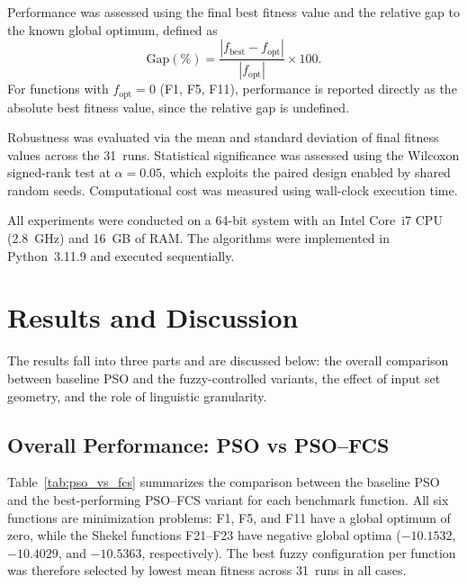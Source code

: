 \documentclass[conference]{IEEEtran}
\begin{document}
Performance was assessed using the final best fitness value and the relative gap to the known global optimum, defined as
\begin{equation}
    \text{Gap}(\%) =
    \frac{\left| f_{\text{best}} - f_{\text{opt}} \right|}
    {\left| f_{\text{opt}} \right|} \times 100.
    \label{eq:gap_metric}
\end{equation}
For functions with $f_{\text{opt}} = 0$ (F1, F5, F11), performance is reported directly as the absolute best fitness value, since the relative gap is undefined.

Robustness was evaluated via the mean and standard deviation of final fitness values across the 31~runs. Statistical significance was assessed using the Wilcoxon signed-rank test at $\alpha = 0.05$, which exploits the paired design enabled by shared random seeds. Computational cost was measured using wall-clock execution time.

All experiments were conducted on a 64-bit system with an Intel Core~i7 CPU (2.8~GHz) and 16~GB of RAM. The algorithms were implemented in Python~3.11.9 and executed sequentially.




\section{Results and Discussion}
\label{sec:results}

The results fall into three parts and are discussed below: the overall comparison between baseline PSO and the fuzzy-controlled variants, the effect of input set geometry, and the role of linguistic granularity.

\subsection{Overall Performance: PSO vs PSO--FCS}
\label{subsec:overall_results}

Table~\ref{tab:pso_vs_fcs} summarizes the comparison between the baseline PSO and the best-performing PSO--FCS variant for each benchmark function. All six functions are minimization problems: F1, F5, and F11 have a global optimum of zero, while the Shekel functions F21--F23 have negative global optima ($-10.1532$, $-10.4029$, and $-10.5363$, respectively). The best fuzzy configuration per function was therefore selected by lowest mean fitness across 31~runs in all cases.
\end{document}
